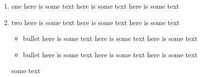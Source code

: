 \begin{enumerate}
	\item one
	      here is some text
	      here is some text
	      here is some text
	\item two
	      here is some text
	      here is some text
	      here is some text
	      \begin{itemize}
	      	\item bullet
	      	      here is some text
	      	      here is some text
	      	      here is some text
	      	\item bullet
	      	      here is some text
	      	      here is some text
	      	      here is some text
	      \end{itemize}
	      some text
\end{enumerate}
